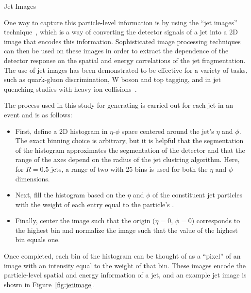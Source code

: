 \begin{section}{Jet Images}

One way to capture this particle-level information is by using the ``jet images'' technique~\cite{Cogan:2014oua,deOliveira:2015xxd}, which is a way of converting the detector signals of a jet into a 2D image that encodes this information.
Sophisticated image processing techniques can then be used on these images in order to extract the dependence of the detector response on the spatial and energy correlations of the jet fragmentation.
The use of jet images has been demonstrated to be effective for a variety of tasks, such as quark-gluon discrimination, W boson and top tagging, and in jet quenching studies with heavy-ion collisions~\cite{Cogan:2014oua,deOliveira:2015xxd,Barnard:2016qma,Kasieczka:2017nvn,Chien:2018dfn,Komiske:2016rsd}.

The process used in this study for generating is carried out for each jet in an event and is as follows:
\begin{itemize}
\item First, define a 2D histogram in $\eta$-$\phi$ space centered around the jet's $\eta$ and $\phi$. 
The exact binning choice is arbitrary, but it is helpful that the segmentation of the histogram approximates the segmentation of the detector and that the range of the axes depend on the radius of the jet clustring algorithm.
Here, for $R = 0.5$ jets, a range of two with 25 bins is used for both the $\eta$ and $\phi$ dimensions.
\item Next, fill the histogram based on the $\eta$ and $\phi$ of the constituent jet particles with the weight of each entry equal to the particle's \pT.
\item Finally, center the image such that the origin ($\eta = 0$, $\phi = 0$) corresponds to the highest \pT bin and normalize the image such that the value of the highest \pT bin equals one. 
\end{itemize}
Once completed, each bin of the histogram can be thought of as a ``pixel'' of an image with an intensity equal to the weight of that bin.
These images encode the particle-level spatial and energy information of a jet, and an example jet image is shown in Figure~\ref{fig:jetimage}.


\end{section}
